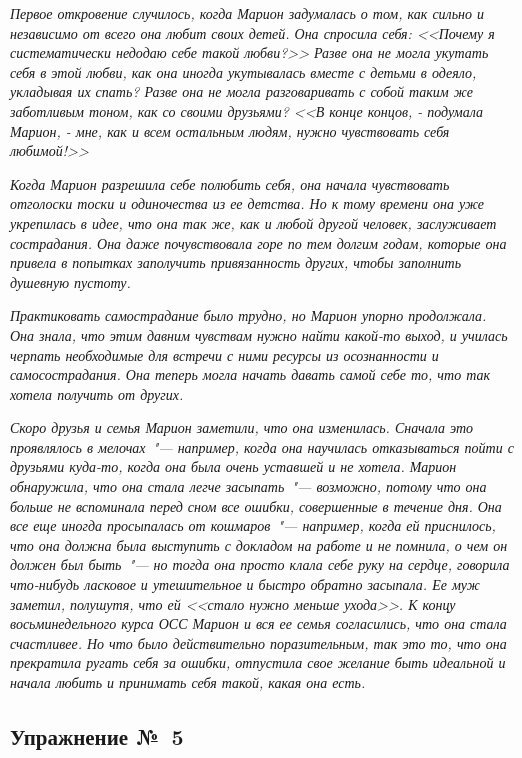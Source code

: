 \textit{Первое откровение случилось, когда Марион задумалась о том, как сильно и независимо от всего она любит своих детей. Она спросила себя: <<Почему я систематически недодаю себе такой любви?>> Разве она не могла укутать себя в этой любви, как она иногда укутывалась вместе с детьми в одеяло, укладывая их спать? Разве она не могла разговаривать с собой таким же заботливым тоном, как со своими друзьями? <<В конце концов, - подумала Марион, - мне, как и всем остальным людям, нужно чувствовать себя любимой!>>}

\textit{Когда Марион разрешила себе полюбить себя, она начала чувствовать отголоски тоски и одиночества из ее детства. Но к тому времени она уже укрепилась в идее, что она так же, как и любой другой человек, заслуживает сострадания. Она даже почувствовала горе по тем долгим годам, которые она привела в попытках заполучить привязанность других, чтобы заполнить душевную пустоту.}

\textit{Практиковать самострадание было трудно, но Марион упорно продолжала. Она знала, что этим давним чувствам нужно найти какой-то выход, и училась черпать необходимые для встречи с ними ресурсы из осознанности и самосострадания. Она теперь могла начать давать самой себе то, что так хотела получить от других.}

\textit{Скоро друзья и семья Марион заметили, что она изменилась. Сначала это проявлялось в мелочах~"--- например, когда она научилась отказываться пойти с друзьями куда-то, когда она была очень уставшей и не хотела. Марион обнаружила, что она стала легче засыпать~"--- возможно, потому что она больше не вспоминала перед сном все ошибки, совершенные в течение дня. Она все еще иногда просыпалась от кошмаров~"--- например, когда ей приснилось, что она должна была выступить с докладом на работе и не помнила, о чем он должен был быть~"--- но тогда она просто клала себе руку на сердце, говорила что-нибудь ласковое и утешительное и быстро обратно засыпала. Ее муж заметил, полушутя, что ей <<стало нужно меньше ухода>>. К концу восьминедельного курса ОСС Марион и вся ее семья согласились, что она стала счастливее. Но что было действительно поразительным, так это то, что она прекратила ругать себя за ошибки, отпустила свое желание быть идеальной и начала любить и принимать себя такой, какая она есть.}

\subsection{Упражнение №~5}

